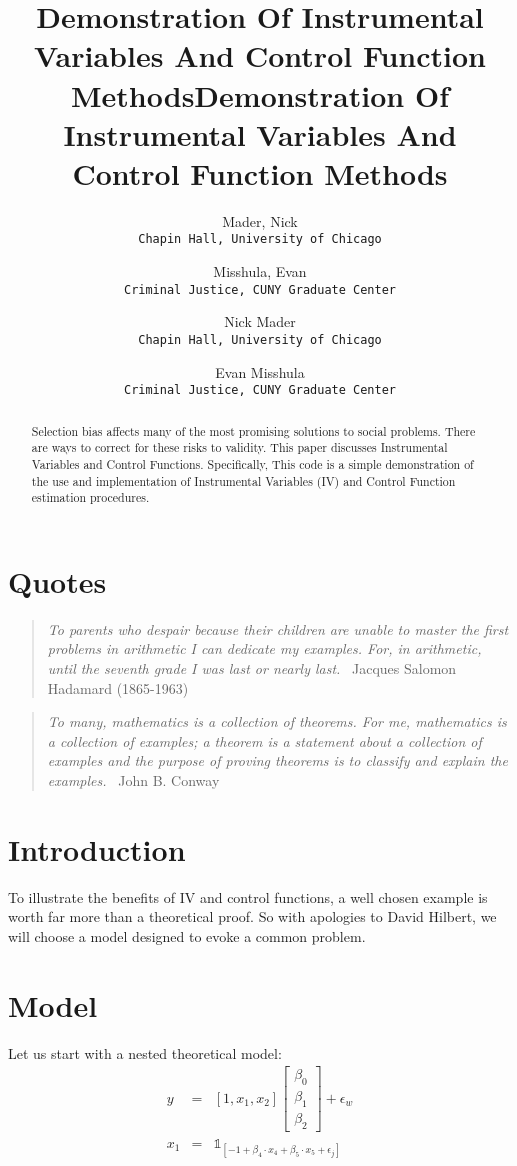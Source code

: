 \documentclass[11pt]{article}
\author{Mader, Nick\\ \texttt{Chapin Hall, University of Chicago} \and Misshula, Evan\\ \texttt{Criminal Justice, CUNY Graduate Center}}
\title{Demonstration Of Instrumental Variables And Control Function Methods}
\author{Nick Mader\\ \texttt{Chapin Hall, University of Chicago} \and Evan Misshula\\ \texttt{Criminal Justice, CUNY Graduate Center}}
\date{}
\title{Demonstration Of Instrumental Variables And Control Function Methods}
\begin{document}
\maketitle
\begin{abstract}
Selection bias affects many of the most promising solutions to social
problems. There are ways to correct for these risks to validity. This
paper discusses Instrumental Variables and Control
Functions. Specifically, This code is a simple demonstration of the
use and implementation of Instrumental Variables (IV) and Control
Function estimation procedures.
\end{abstract}


\section[Quotes]{Quotes}
\label{sec-1}

\begin{quote}
\emph{To parents who despair because their children are unable to master
 the first problems in arithmetic I can dedicate my examples. For, in
 arithmetic, until the seventh grade I was last or nearly last.}
~Jacques Salomon Hadamard (1865-1963)  
\end{quote}

\begin{quote}
\emph{To many, mathematics is a collection of theorems. For me, mathematics
is a collection of examples; a theorem is a statement about a
collection of examples and the purpose of proving theorems is to
classify and explain the examples.}  ~John B. Conway
\end{quote}
\section[Introduction]{Introduction}
\label{sec-2}

To illustrate the benefits of IV and control functions, a well chosen
example is worth far more than a theoretical proof.  So with apologies
to David Hilbert, we will choose a model designed to evoke a common
problem.
\section[Model]{Model}
\label{sec-3}

Let us start with a nested theoretical model:
\begin{equation*}
\begin{array}{rcl}
y & = & [1, x_1, x_2] 
\begin{bmatrix}
\beta_0  \\
\beta_1  \\
\beta_2  \end{bmatrix}
  + \epsilon_w \\
x_1 & = & \mathds{1}_{[-1 + \beta_4 \cdot x_4 + \beta_5 \cdot x_5 + \epsilon_j]}
\end{array}
\end{equation*}  
\end{document}
